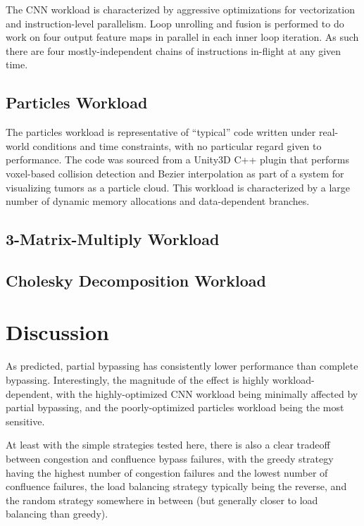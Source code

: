 \documentclass[11pt]{article}
\begin{document}
The CNN workload is characterized by aggressive optimizations for
vectorization and instruction-level parallelism. Loop unrolling and
fusion is performed to do work on four output feature maps in parallel
in each inner loop iteration. As such there are four
mostly-independent chains of instructions in-flight at any given time.



\subsection{Particles Workload}

The particles workload is representative of ``typical'' code written
under real-world conditions and time constraints, with no particular
regard given to performance. The code was sourced from a Unity3D C++
plugin that performs voxel-based collision detection and Bezier
interpolation as part of a system for visualizing tumors as a particle
cloud. This workload is characterized by a large number of dynamic
memory allocations and data-dependent branches.



\subsection{3-Matrix-Multiply Workload}



\subsection{Cholesky Decomposition Workload}



\section{Discussion}

As predicted, partial bypassing has consistently lower performance
than complete bypassing. Interestingly, the magnitude of the effect is
highly workload-dependent, with the highly-optimized CNN workload
being minimally affected by partial bypassing, and the
poorly-optimized particles workload being the most sensitive.

At least with the simple strategies tested here, there is also a
clear tradeoff between congestion and confluence bypass failures,
with the greedy strategy having the highest number of congestion
failures and the lowest number of confluence failures, the load
balancing strategy typically being the reverse, and the random
strategy somewhere in between (but generally closer to load
balancing than greedy).
\end{document}

